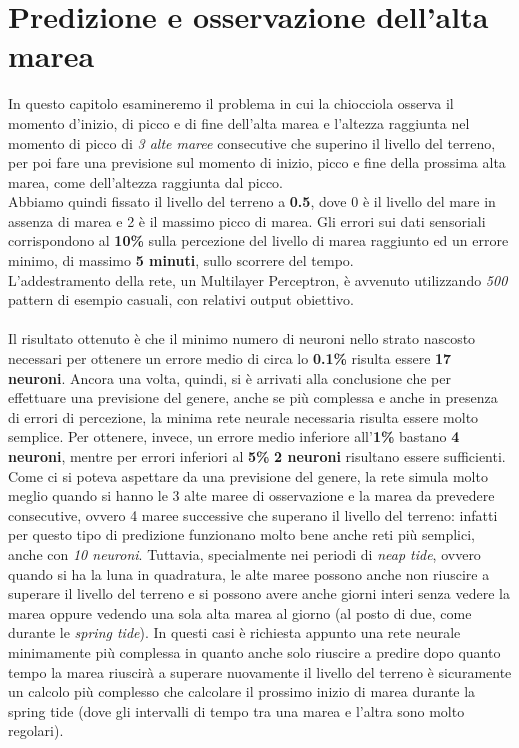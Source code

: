 \chapter{Predizione e osservazione dell'alta marea}
	In questo capitolo esamineremo il problema in cui la chiocciola osserva il momento d'inizio, di picco e di fine dell'alta marea e l'altezza raggiunta nel momento di picco di \textit{3 alte maree} consecutive che superino il livello del terreno, per poi fare una previsione sul momento di inizio, picco e fine della prossima alta marea, come dell'altezza raggiunta dal picco.\\
	Abbiamo quindi fissato il livello del terreno a \textbf{0.5}, dove 0 è il livello del mare in assenza di marea e 2 è il massimo picco di marea. Gli errori sui dati sensoriali corrispondono al \textbf{10\%} sulla percezione del livello di marea raggiunto ed un errore minimo, di massimo \textbf{5 minuti}, sullo scorrere del tempo.\\
	L'addestramento della rete, un Multilayer Perceptron, è avvenuto utilizzando \textit{500} pattern di esempio casuali, con relativi output obiettivo.\\
	\\
	Il risultato ottenuto è che il minimo numero di neuroni nello strato nascosto necessari per ottenere un errore medio di circa lo \textbf{0.1\%} risulta essere \textbf{17 neuroni}. Ancora una volta, quindi, si è arrivati alla conclusione che per effettuare una previsione del genere, anche se più complessa e anche in presenza di errori di percezione, la minima rete neurale necessaria risulta essere molto semplice. Per ottenere, invece, un errore medio inferiore all'\textbf{1\%} bastano \textbf{4 neuroni}, mentre per errori inferiori al \textbf{5\%} \textbf{2 neuroni} risultano essere sufficienti.\\
	Come ci si poteva aspettare da una previsione del genere, la rete simula molto meglio quando si hanno le 3 alte maree di osservazione e la marea da prevedere consecutive, ovvero 4 maree successive che superano il livello del terreno: infatti per questo tipo di predizione funzionano molto bene anche reti più semplici, anche con \textit{10 neuroni}. Tuttavia, specialmente nei periodi di \textit{neap tide}, ovvero quando si ha la luna in quadratura, le alte maree possono anche non riuscire a superare il livello del terreno e si possono avere anche giorni interi senza vedere la marea oppure vedendo una sola alta marea al giorno (al posto di due, come durante le \textit{spring tide}). In questi casi è richiesta appunto una rete neurale minimamente più complessa in quanto anche solo riuscire a predire dopo quanto tempo la marea riuscirà a superare nuovamente il livello del terreno è sicuramente un calcolo più complesso che calcolare il prossimo inizio di marea durante la spring tide (dove gli intervalli di tempo tra una marea e l'altra sono molto regolari).\\

